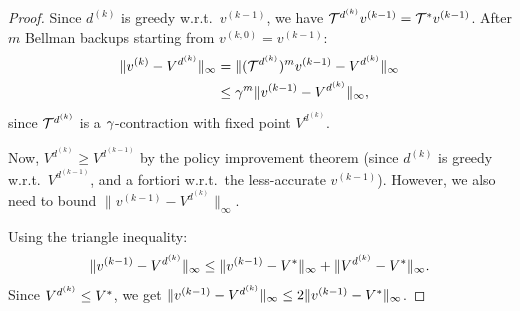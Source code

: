 \documentclass[11pt,a4paper]{article}
\begin{document}
\begin{proof}
Since $d^{(k)}$ is greedy w.r.t.\ $v^{(k-1)}$, we have
$\mathcal{T}^{d^{(k)}} v^{(k-1)} = \mathcal{T}^* v^{(k-1)}$. After $m$
Bellman backups starting from $v^{(k,0)} = v^{(k-1)}$:
\begin{align*}
    \|v^{(k)} - V^{d^{(k)}}\|_\infty
    &= \|(\mathcal{T}^{d^{(k)}})^m v^{(k-1)} - V^{d^{(k)}}\|_\infty \\
    &\leq \gamma^m \|v^{(k-1)} - V^{d^{(k)}}\|_\infty,
\end{align*}
since $\mathcal{T}^{d^{(k)}}$ is a $\gamma$-contraction with fixed
point $V^{d^{(k)}}$.

Now, $V^{d^{(k)}} \geq V^{d^{(k-1)}}$ by the policy improvement
theorem (since $d^{(k)}$ is greedy w.r.t.\ $V^{d^{(k-1)}}$, and
a fortiori w.r.t.\ the less-accurate $v^{(k-1)}$). However, we
also need to bound $\|v^{(k-1)} - V^{d^{(k)}}\|_\infty$.

Using the triangle inequality:
\[
    \|v^{(k-1)} - V^{d^{(k)}}\|_\infty
    \leq \|v^{(k-1)} - V^*\|_\infty +
    \|V^{d^{(k)}} - V^*\|_\infty.
\]
Since $V^{d^{(k)}} \leq V^*$, we get
$\|v^{(k-1)} - V^{d^{(k)}}\|_\infty \leq
2\|v^{(k-1)} - V^*\|_\infty$.


\end{proof}
\end{document}
